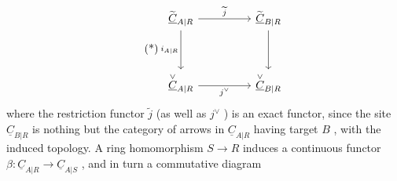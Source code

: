 \begin{equation}\tag{*}
\begin{tikzcd}[column sep=huge, row sep=huge]
\widetilde{\underline{C}}_{A|R} \arrow[r, "\widetilde{j}"] \arrow[d, "i_{A|R}"'] & \widetilde{\underline{C}}_{B|R} \arrow[d] \\
\overset{\vee}{\underline{C}}_{A|R} \arrow[r, "j^{\vee}"'] & \overset{\vee}{\underline{C}}_{B|R}
\end{tikzcd}
\end{equation}
where the restriction functor  $\widetilde{j}$  (as well as  $j^{\vee}$ )  is an exact functor, since the site  $\underline{C}_{B|R}$  is nothing but the category of arrows in  $\underline{C}_{A|R}$  having target  $B$ , with the induced topology. A ring homomorphism  $S \to R$  induces a continuous functor  $\beta : \underline{C}_{A|R} \to \underline{C}_{A|S}$ , and in turn a commutative diagram

